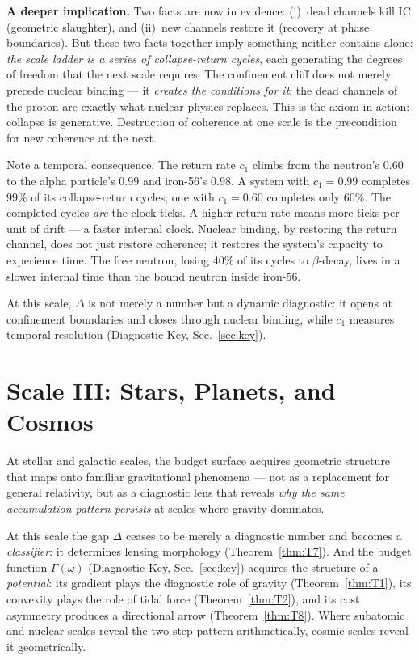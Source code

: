 \documentclass[
  aps,
  prd,
  twocolumn,
  superscriptaddress,
  nofootinbib,
  floatfix
]{revtex4-2}
\newcommand{\Gam}{\Gamma}
\newcommand{\IC}{\mathrm{IC}}
\begin{document}
\textbf{A deeper implication.}
Two facts are now in evidence: (i)~dead channels kill $\IC$
(geometric slaughter), and (ii)~new channels restore it
(recovery at phase boundaries).  But these two facts together
imply something neither contains alone: \emph{the scale ladder
is a series of collapse-return cycles}, each generating
the degrees of freedom that the next scale requires.  The
confinement cliff does not merely precede nuclear binding ---
it \emph{creates the conditions for it}: the dead channels of
the proton are exactly what nuclear physics replaces.  This is
the axiom in action: collapse is generative.  Destruction of
coherence at one scale is the precondition for new coherence
at the next.

Note a temporal consequence.  The return rate $c_1$ climbs
from the neutron's $0.60$ to the alpha particle's $0.99$ and
iron-56's $0.98$.  A system with $c_1 = 0.99$ completes
$99\%$ of its collapse-return cycles; one with $c_1 = 0.60$
completes only $60\%$.  The completed cycles \emph{are}
the clock ticks.  A higher return rate means more ticks per
unit of drift --- a faster internal clock.  Nuclear binding,
by restoring the return channel, does not just restore
coherence; it restores the system's capacity to experience
time.  The free neutron, losing $40\%$ of its cycles to
$\beta$-decay, lives in a slower internal time than the
bound neutron inside iron-56.

At this scale, $\Delta$ is not merely a number but a
dynamic diagnostic: it opens at confinement boundaries and
closes through nuclear binding, while $c_1$ measures
temporal resolution (Diagnostic Key, Sec.~\ref{sec:key}).


\section{Scale III: Stars, Planets, and Cosmos}
\label{sec:cosmos}

At stellar and galactic scales, the budget surface acquires
geometric structure that maps onto familiar gravitational
phenomena --- not as a replacement for general relativity,
but as a diagnostic lens that reveals \emph{why the same
accumulation pattern persists} at scales where gravity
dominates.

At this scale the gap $\Delta$ ceases to be merely a
diagnostic number and becomes a \emph{classifier}: it
determines lensing morphology (Theorem~\ref{thm:T7}).  And
the budget function $\Gam(\omega)$ (Diagnostic Key,
Sec.~\ref{sec:key}) acquires the structure of a
\emph{potential}: its gradient plays the diagnostic role of
gravity (Theorem~\ref{thm:T1}), its convexity plays the
role of tidal force (Theorem~\ref{thm:T2}), and its cost
asymmetry produces a directional arrow
(Theorem~\ref{thm:T8}).  Where subatomic and nuclear scales
reveal the two-step pattern arithmetically, cosmic scales
reveal it geometrically.
\end{document}
